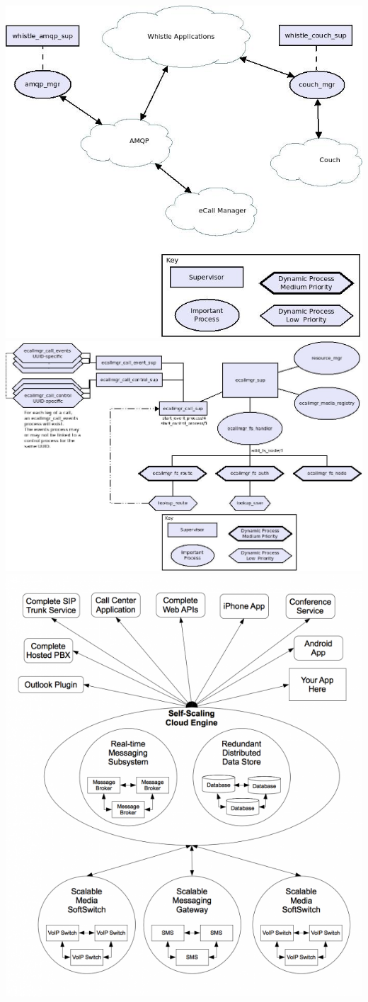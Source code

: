\includegraphics[width=\linewidth]{wh-messaging}
\includegraphics[width=\linewidth]{ecallmgr}
\includegraphics[width=\linewidth]{concept}